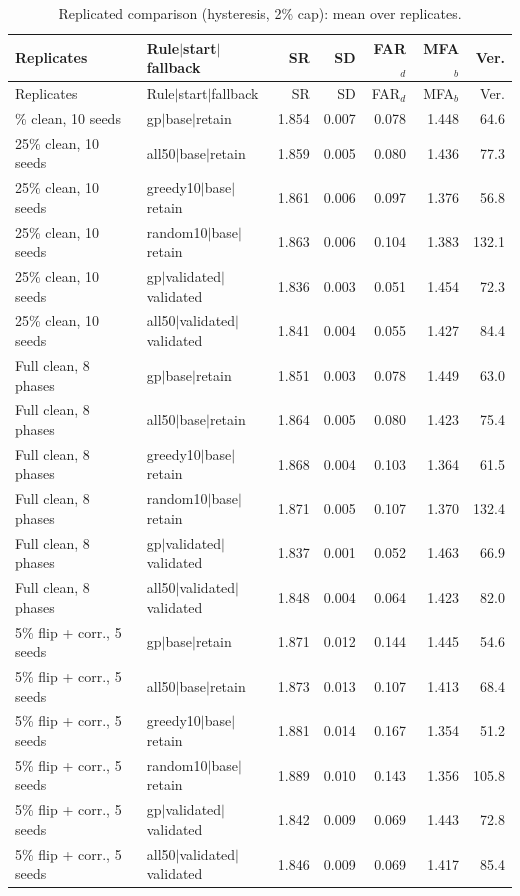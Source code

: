 {\footnotesize\setlength{\tabcolsep}{4pt}
\begin{longtable}{llrrrrr}
\caption{Replicated comparison (hysteresis, 2\% cap): mean over replicates.}\label{tab:s7_rep}\\
\toprule
Replicates & Rule$|$start$|$fallback & SR & SD & FAR$_d$ & MFA$_b$ & Ver.\\
\midrule
\endfirsthead
\toprule
Replicates & Rule$|$start$|$fallback & SR & SD & FAR$_d$ & MFA$_b$ & Ver.\\
\midrule
\endhead
\bottomrule
\endfoot
25\% clean, 10 seeds & gp$|$base$|$retain & 1.854 & 0.007 & 0.078 & 1.448 & 64.6\\
25\% clean, 10 seeds & all50$|$base$|$retain & 1.859 & 0.005 & 0.080 & 1.436 & 77.3\\
25\% clean, 10 seeds & greedy10$|$base$|$retain & 1.861 & 0.006 & 0.097 & 1.376 & 56.8\\
25\% clean, 10 seeds & random10$|$base$|$retain & 1.863 & 0.006 & 0.104 & 1.383 & 132.1\\
25\% clean, 10 seeds & gp$|$validated$|$validated & 1.836 & 0.003 & 0.051 & 1.454 & 72.3\\
25\% clean, 10 seeds & all50$|$validated$|$validated & 1.841 & 0.004 & 0.055 & 1.427 & 84.4\\
Full clean, 8 phases & gp$|$base$|$retain & 1.851 & 0.003 & 0.078 & 1.449 & 63.0\\
Full clean, 8 phases & all50$|$base$|$retain & 1.864 & 0.005 & 0.080 & 1.423 & 75.4\\
Full clean, 8 phases & greedy10$|$base$|$retain & 1.868 & 0.004 & 0.103 & 1.364 & 61.5\\
Full clean, 8 phases & random10$|$base$|$retain & 1.871 & 0.005 & 0.107 & 1.370 & 132.4\\
Full clean, 8 phases & gp$|$validated$|$validated & 1.837 & 0.001 & 0.052 & 1.463 & 66.9\\
Full clean, 8 phases & all50$|$validated$|$validated & 1.848 & 0.004 & 0.064 & 1.423 & 82.0\\
5\% flip + corr., 5 seeds & gp$|$base$|$retain & 1.871 & 0.012 & 0.144 & 1.445 & 54.6\\
5\% flip + corr., 5 seeds & all50$|$base$|$retain & 1.873 & 0.013 & 0.107 & 1.413 & 68.4\\
5\% flip + corr., 5 seeds & greedy10$|$base$|$retain & 1.881 & 0.014 & 0.167 & 1.354 & 51.2\\
5\% flip + corr., 5 seeds & random10$|$base$|$retain & 1.889 & 0.010 & 0.143 & 1.356 & 105.8\\
5\% flip + corr., 5 seeds & gp$|$validated$|$validated & 1.842 & 0.009 & 0.069 & 1.443 & 72.8\\
5\% flip + corr., 5 seeds & all50$|$validated$|$validated & 1.846 & 0.009 & 0.069 & 1.417 & 85.4\\
\end{longtable}}
